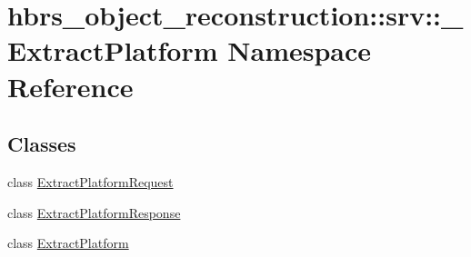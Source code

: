 \hypertarget{namespacehbrs__object__reconstruction_1_1srv_1_1___extract_platform}{\section{hbrs\-\_\-object\-\_\-reconstruction\-:\-:srv\-:\-:\-\_\-\-Extract\-Platform \-Namespace \-Reference}
\label{namespacehbrs__object__reconstruction_1_1srv_1_1___extract_platform}
}
\subsection*{\-Classes}
\begin{DoxyCompactItemize}
\item 
class \hyperlink{classhbrs__object__reconstruction_1_1srv_1_1___extract_platform_1_1_extract_platform_request}{\-Extract\-Platform\-Request}
\item 
class \hyperlink{classhbrs__object__reconstruction_1_1srv_1_1___extract_platform_1_1_extract_platform_response}{\-Extract\-Platform\-Response}
\item 
class \hyperlink{classhbrs__object__reconstruction_1_1srv_1_1___extract_platform_1_1_extract_platform}{\-Extract\-Platform}
\end{DoxyCompactItemize}
